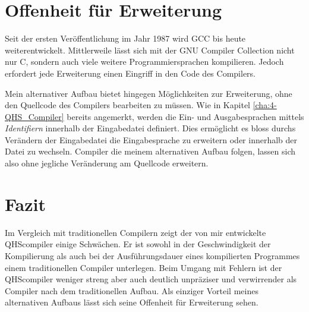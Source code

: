 \section{Offenheit für Erweiterung}
Seit der ersten Veröffentlichung im Jahr 1987 wird GCC bis heute weiterentwickelt.
Mittlerweile lässt sich mit der GNU Compiler Collection nicht nur C, sondern auch viele weitere Programmiersprachen kompilieren. 
Jedoch erfordert jede Erweiterung einen Eingriff in den Code des Compilers.

Mein alternativer Aufbau bietet hingegen Möglichkeiten zur Erweiterung, ohne den Quellcode des Compilers bearbeiten zu müssen.
Wie in Kapitel \ref{cha:4-QHS_Compiler} bereits angemerkt, werden die Ein- und Ausgabesprachen mittels \textit{Identifiern} innerhalb der Eingabedatei definiert. 
Dies ermöglicht es bloss durchs Verändern der Eingabedatei die Eingabesprache zu erweitern oder innerhalb der Datei zu wechseln.
Compiler die meinem alternativen Aufbau folgen, lassen sich also ohne jegliche Veränderung am Quellcode erweitern.



\section{Fazit}
Im Vergleich mit traditionellen Compilern zeigt der von mir entwickelte QHScompiler einige Schwächen.
Er ist sowohl in der Geschwindigkeit der Kompilierung als auch bei der Ausführungsdauer eines kompilierten Programmes einem traditionellen Compiler unterlegen.
Beim Umgang mit Fehlern ist der QHScompiler weniger streng aber auch deutlich unpräziser und verwirrender als Compiler nach dem traditionellen Aufbau.
Als einziger Vorteil meines alternativen Aufbaus lässt sich seine Offenheit für Erweiterung sehen.

